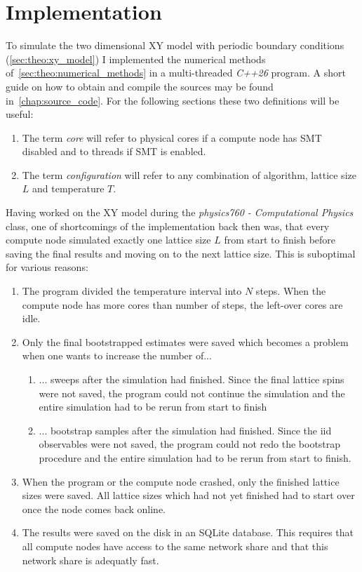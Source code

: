 \chapter{Implementation}\label{sec:impl}
	To simulate the two dimensional XY model with periodic boundary conditions (\cref{sec:theo:xy_model}) I implemented the numerical methods of~\cref{sec:theo:numerical_methods} in a multi-threaded \emph{C++26} program. A short guide on how to obtain and compile the sources may be found in~\cref{chap:source_code}. For the following sections these two definitions will be useful:
	\begin{enumerate}
		\item The term \emph{core} will refer to physical cores if a compute node has SMT disabled and to threads if SMT is enabled.
		\item The term \emph{configuration} will refer to any combination of algorithm, lattice size $L$ and temperature $T$.
	\end{enumerate}
	
	Having worked on the XY model during the \emph{physics760 - Computational Physics} class, one of shortcomings of the implementation back then was, that every compute node simulated exactly one lattice size $L$ from start to finish before saving the final results and moving on to the next lattice size. This is suboptimal for various reasons:
	\begin{enumerate}
		\item \label{shortcomings:cores} The program divided the temperature interval into $N$ steps. When the compute node has more cores than number of steps, the left-over cores are idle.
		\item Only the final bootstrapped estimates were saved which becomes a problem when one wants to increase the number of...
		\begin{enumerate}
			\item \label{shortcomings:sweeps}  ... sweeps after the simulation had finished. Since the final lattice spins were not saved, the program could not continue the simulation and the entire simulation had to be rerun from start to finish
			\item \label{shortcomings:bootstrap} ... bootstrap samples after the simulation had finished. Since the iid observables were not saved, the program could not redo the bootstrap procedure and the entire simulation had to be rerun from start to finish.
		\end{enumerate}
		\item \label{shortcomings:crashed} When the program or the compute node crashed, only the finished lattice sizes were saved. All lattice sizes which had not yet finished had to start over once the node comes back online.
		\item \label{shortcomings:sqlite} The results were saved on the disk in an SQLite database. This requires that all compute nodes have access to the same network share and that this network share is adequatly fast. 
	\end{enumerate}